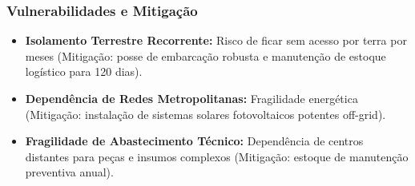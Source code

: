 \subsubsection{Vulnerabilidades e
Mitigação}

\begin{itemize}
\tightlist
\item
  \textbf{Isolamento Terrestre Recorrente:} Risco de ficar sem acesso
  por terra por meses (Mitigação: posse de embarcação robusta e
  manutenção de estoque logístico para 120 dias).
\item
  \textbf{Dependência de Redes Metropolitanas:} Fragilidade energética
  (Mitigação: instalação de sistemas solares fotovoltaicos potentes
  off-grid).
\item
  \textbf{Fragilidade de Abastecimento Técnico:} Dependência de centros
  distantes para peças e insumos complexos (Mitigação: estoque de
  manutenção preventiva anual).
\end{itemize}

